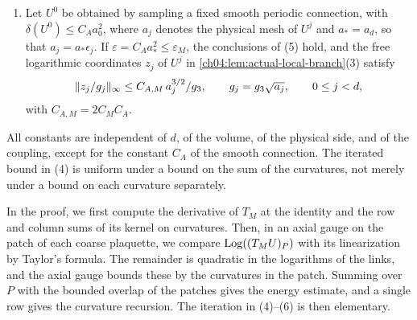 \begin{theorem}
\begin{enumerate}
\[
 0<\varepsilon\le\varepsilon_M,\qquad\varepsilon_M\le\min\bigl\{\delta_*/2,\ M^2(M^2-1)/(4c_M)\bigr\}.
\]
If $\delta(U^0)\le\varepsilon\epsilon_0^2$, then each of $U^0,\dots,U^{d-1}$ satisfies the hypothesis of \cref{ch04:lem:actual-local-branch}(3), and
\[
 \delta(U^j)\le2\varepsilon\epsilon_j^2\quad(0\le j\le d),\qquad\sum_{j<d}\delta(U^j)\le\frac{2\varepsilon}{M^2-1},
\]
and
\[
 \frac{4\mathscr E(U^d)}{g_d^2}\le e^{2C_M\varepsilon/(M^2-1)}\,\frac{4\mathscr E(U^0)}{g_0^2}.
\]
\item Let $U^0$ be obtained by sampling a fixed smooth periodic connection, with $\delta(U^0)\le C_Aa_0^2$, where $a_j$ denotes the physical mesh of $U^j$ and $a_*=a_d$, so that $a_j=a_*\epsilon_j$. If $\varepsilon=C_Aa_*^2\le\varepsilon_M$, the conclusions of (5) hold, and the free logarithmic coordinates $z_j$ of $U^j$ in \cref{ch04:lem:actual-local-branch}(3) satisfy
\[
 \lVert z_j/g_j\rVert_\infty\le C_{A,M}\,a_j^{3/2}/g_3,\qquad g_j=g_3\sqrt{a_j},\qquad0\le j<d,
\]
with $C_{A,M}=2C_MC_A$.
\end{enumerate}
All constants are independent of $d$, of the volume, of the physical side, and of the coupling, except for the constant $C_A$ of the smooth connection. The iterated bound in (4) is uniform under a bound on the sum of the curvatures, not merely under a bound on each curvature separately.
\end{theorem}

In the proof, we first compute the derivative of $T_M$ at the identity and the row and column sums of its kernel on curvatures. Then, in an axial gauge on the patch of each coarse plaquette, we compare $\operatorname{Log}((T_MU)_P)$ with its linearization by Taylor's formula. The remainder is quadratic in the logarithms of the links, and the axial gauge bounds these by the curvatures in the patch. Summing over $P$ with the bounded overlap of the patches gives the energy estimate, and a single row gives the curvature recursion. The iteration in (4)--(6) is then elementary.

